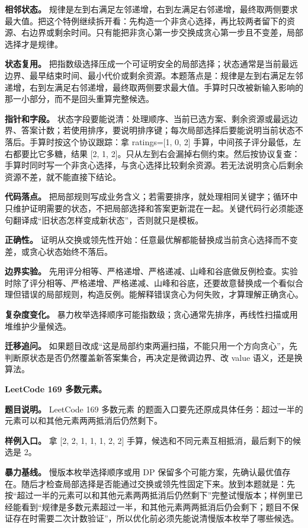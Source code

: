 \textbf{相邻状态。} 规律是左到右满足左邻递增，右到左满足右邻递增，最终取两侧要求最大值。把这个特例继续拆开看：先构造一个非贪心选择，再比较两者留下的资源、右边界或剩余时间。只有能把非贪心第一步交换成贪心第一步且不变差，局部选择才是规律。

\textbf{状态复用。} 把指数级选择压成一个可证明安全的局部选择；状态通常是当前最远边界、最早结束时间、最小代价或剩余资源。本题落点是：规律是左到右满足左邻递增，右到左满足右邻递增，最终取两侧要求最大值。手算时只改被新输入影响的那一小部分，而不是回头重算完整候选。

\textbf{指针和字段。} 状态字段要能说清：处理顺序、当前已选方案、剩余资源或最远边界、答案计数；若使用排序，要说明排序键；每次局部选择后要能说明当前状态不落后。手算时按这个协议跟踪：拿 ratings=[1, 0, 2] 手算，中间孩子评分最低，左右都要比它多糖，结果 [2, 1, 2]。只从左到右会漏掉右侧约束。然后按协议复查：手算时同时写一个非贪心选择，与贪心选择比较剩余资源。若无法说明贪心后剩余资源不差，就不能直接下结论。

\textbf{代码落点。} 把局部规则写成业务含义；若需要排序，就处理相同关键字；循环中只维护证明需要的状态，不把局部选择和答案更新混在一起。关键代码行必须能逐句翻译成“旧状态怎样变成新状态”，否则就只是模板。

\textbf{正确性。} 证明从交换或领先性开始：任意最优解都能替换成当前贪心选择而不变差，或贪心状态始终不落后。

\textbf{边界实验。} 先用评分相等、严格递增、严格递减、山峰和谷底做反例检查。实验时除了评分相等、严格递增、严格递减、山峰和谷底，还要故意替换成一个看似合理但错误的局部规则，构造反例。能解释错误贪心为何失败，才算理解正确贪心。

\textbf{复杂度变化。} 暴力枚举选择顺序可能指数级；贪心通常先排序，再线性扫描或用堆维护少量候选。

\textbf{迁移追问。} 如果题目改成“这是局部约束两遍扫描，不能只用一个方向贪心”，先判断原状态是否仍然覆盖新答案集合，再决定是微调边界、改 value 语义，还是换算法。

\noindent\textbf{LeetCode 169 多数元素。}

\textbf{题目说明。} LeetCode 169 多数元素 的题面入口要先还原成具体任务：超过一半的元素可以和其他元素两两抵消后仍然剩下。

\textbf{样例入口。} 拿 [2, 2, 1, 1, 1, 2, 2] 手算，候选和不同元素互相抵消，最后剩下的候选是 2。

\textbf{暴力基线。} 慢版本枚举选择顺序或用 DP 保留多个可能方案，先确认最优值存在。随后才检查局部选择是否能通过交换或领先性固定下来。放到本题就是：先按“超过一半的元素可以和其他元素两两抵消后仍然剩下”完整试慢版本；样例里已经能看到“规律是多数元素超过一半，和其他元素两两抵消后仍会剩下；题目不保证存在时需要二次计数验证”，所以优化前必须先能说清慢版本枚举了哪些候选。

